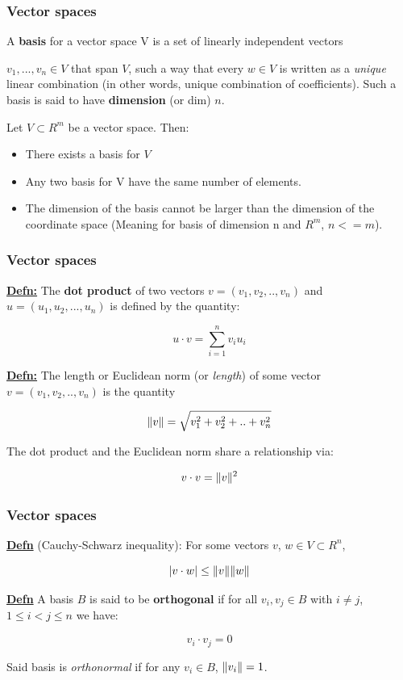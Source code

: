 \documentclass{beamer}
\DeclarePairedDelimiter{\norm}{\lVert}{\rVert}
\begin{document}
\begin{frame}
\frametitle{Vector spaces}
A \textbf{basis} for a vector space V is a set of linearly independent vectors

$v_1,..., v_n \in V$  that span $V$, such a way that every $w \in V$ is written as a \textit{unique} linear combination (in other words, unique combination of coefficients). Such a basis is said to have \textbf{dimension} (or dim) $n$.

Let $V \subset R^m$ be a vector space. Then:
\begin{itemize}
\item There exists a basis for $V$
\item Any two basis for V have the same number of elements.
\item The dimension of the basis cannot be larger than the dimension of the coordinate space (Meaning for basis of dimension n and $R^m$, $n <= m$).
\end{itemize}



\end{frame}


\begin{frame}
\frametitle{Vector spaces}
\underline{\textbf{Defn:}} The \textbf{dot product} of two vectors $v = (v_1, v_2, .., v_n)$ and $u = (u_1, u_2,...,u_n)$ is defined by the quantity:

\[ u \cdot v = \sum_{i=1}^n v_i u_i \]

\underline{\textbf{Defn:}} The length or Euclidean norm (or \textit{length}) of some vector $v = (v_1, v_2, .., v_n)$ is the quantity 

\[ \norm{v} = \sqrt{v_1^2+v_2^2+..+v_n^2} \]

The dot product and the Euclidean norm share a relationship via:

\[ v \cdot v = \norm{v}^2 \]

\end{frame}

\begin{frame}
\frametitle{Vector spaces}
\underline{\textbf{Defn}} (Cauchy-Schwarz inequality): For some vectors $v$, $w \in V \subset R^n$, 

\[ |v \cdot w | \leq \norm{v}\norm{w} \]

\underline{\textbf{Defn}} A basis $B$ is said to be \textbf{orthogonal} if for all $v_i, v_j \in B$ with $i \neq j$, $1 \leq i < j \leq n$ we have:

\[ v_i \cdot v_j = 0 \]

Said basis is \textit{orthonormal} if for any $v_i \in B$, $\norm{v_i} = 1$.

\end{frame} 
\end{document}
